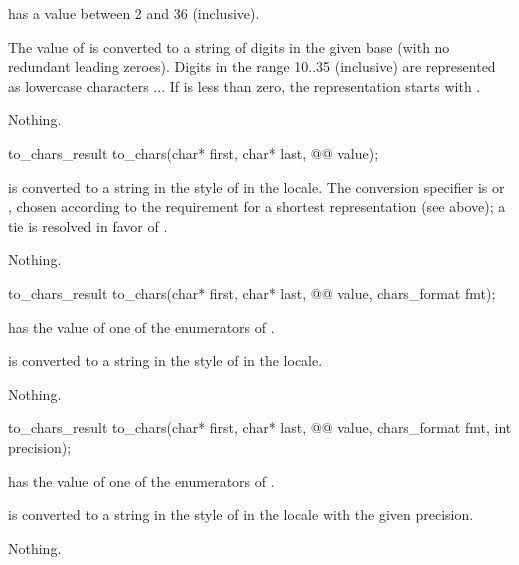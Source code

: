 \begin{itemdescr}
\pnum
\expects
{} has a value between 2 and 36 (inclusive).

\pnum
\effects
The value of  is converted
to a string of digits in the given base
(with no redundant leading zeroes).
Digits in the range 10..35 (inclusive)
are represented as lowercase characters ...
If  is less than zero,
the representation starts with .

\pnum
\throws
Nothing.
\end{itemdescr}

%
\begin{itemdecl}
to_chars_result to_chars(char* first, char* last, @@ value);
\end{itemdecl}

\begin{itemdescr}
\pnum
\effects
{} is converted to a string
in the style of 
in the  locale.
The conversion specifier is  or ,
chosen according to the requirement for a shortest representation
(see above);
a tie is resolved in favor of .

\pnum
\throws
Nothing.
\end{itemdescr}

%
\begin{itemdecl}
to_chars_result to_chars(char* first, char* last, @@ value, chars_format fmt);
\end{itemdecl}

\begin{itemdescr}
\pnum
\expects
{} has the value of
one of the enumerators of .

\pnum
\effects
{} is converted to a string
in the style of 
in the  locale.

\pnum
\throws
Nothing.
\end{itemdescr}

%
\begin{itemdecl}
to_chars_result to_chars(char* first, char* last, @@ value,
                         chars_format fmt, int precision);
\end{itemdecl}

\begin{itemdescr}
\pnum
\expects
{} has the value of
one of the enumerators of .

\pnum
\effects
{} is converted to a string
in the style of 
in the  locale
with the given precision.

\pnum
\throws
Nothing.
\end{itemdescr}

